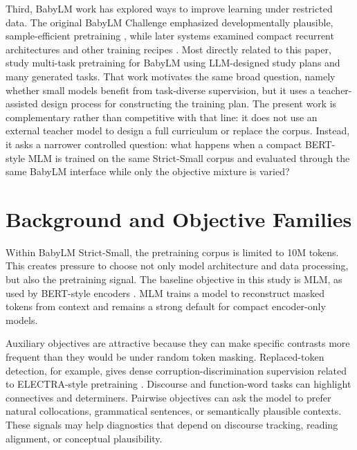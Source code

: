 \documentclass[11pt]{article}
\begin{document}
Third, BabyLM work has explored ways to improve learning under restricted data.
The original BabyLM Challenge emphasized developmentally plausible, sample-efficient pretraining \citep{warstadt2023babylm}, while later systems examined compact recurrent architectures and other training recipes \citep{haller2024babyhgrn}.
Most directly related to this paper, \citet{kamzela2025llm} study multi-task pretraining for BabyLM using LLM-designed study plans and many generated tasks.
That work motivates the same broad question, namely whether small models benefit from task-diverse supervision, but it uses a teacher-assisted design process for constructing the training plan.
The present work is complementary rather than competitive with that line: it does not use an external teacher model to design a full curriculum or replace the corpus.
Instead, it asks a narrower controlled question: what happens when a compact BERT-style MLM is trained on the same Strict-Small corpus and evaluated through the same BabyLM interface while only the objective mixture is varied?

\section{Background and Objective Families}

Within BabyLM Strict-Small, the pretraining corpus is limited to 10M tokens.
This creates pressure to choose not only model architecture and data processing, but also the pretraining signal.
The baseline objective in this study is MLM, as used by BERT-style encoders \citep{devlin2019bert}.
MLM trains a model to reconstruct masked tokens from context and remains a strong default for compact encoder-only models.

Auxiliary objectives are attractive because they can make specific contrasts more frequent than they would be under random token masking.
Replaced-token detection, for example, gives dense corruption-discrimination supervision related to ELECTRA-style pretraining \citep{clark2020electra}.
Discourse and function-word tasks can highlight connectives and determiners.
Pairwise objectives can ask the model to prefer natural collocations, grammatical sentences, or semantically plausible contexts.
These signals may help diagnostics that depend on discourse tracking, reading alignment, or conceptual plausibility.
\end{document}

